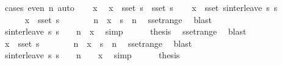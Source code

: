 \begin{isabellebody}
\ {\isacharparenleft}cases\ {\isachardoublequoteopen}even\ n{\isachardoublequoteclose}{\isacharparenright}\ auto\isanewline
{}\isamarkupfalse%
\isanewline
\ \ \isamarkupfalse%
\ x\ \isamarkupfalse%
\ {\isachardoublequoteopen}x\ {\isasymin}\ sset\ s{}\ {\isasymunion}\ sset\ s{}{\isachardoublequoteclose}\isanewline
\ \ \isamarkupfalse%
\ {\isachardoublequoteopen}x\ {\isasymin}\ sset\ {\isacharparenleft}sinterleave\ s{}\ s{}{\isacharparenright}{\isachardoublequoteclose}\isanewline
\ \ \isamarkupfalse%
\isanewline
\ \ \ \ \isamarkupfalse%
\ {\isachardoublequoteopen}x\ {\isasymin}\ sset\ s{}{\isachardoublequoteclose}\isanewline
\ \ \ \ \isamarkupfalse%
\ \isamarkupfalse%
\ n\ \ {\isachardoublequoteopen}x\ {\isacharequal}\ s{}\ {\isacharbang}{\isacharbang}\ n{\isachardoublequoteclose}\ \isamarkupfalse%
\ sset{\isacharunderscore}range\ \isamarkupfalse%
\ blast\isanewline
\ \ \ \ \isamarkupfalse%
\ {\isachardoublequoteopen}sinterleave\ s{}\ s{}\ {\isacharbang}{\isacharbang}\ {\isacharparenleft}{}\ {\isacharasterisk}\ n{\isacharparenright}\ {\isacharequal}\ x{\isachardoublequoteclose}\ \isamarkupfalse%
\ simp\isanewline
\ \ \ \ \isamarkupfalse%
\ {\isacharquery}thesis\ \isamarkupfalse%
\ sset{\isacharunderscore}range\ \isamarkupfalse%
\ blast\isanewline
\ \ \isamarkupfalse%
\isanewline
\ \ \ \ \isamarkupfalse%
\ {\isachardoublequoteopen}x\ {\isasymin}\ sset\ s{}{\isachardoublequoteclose}\isanewline
\ \ \ \ \isamarkupfalse%
\ \isamarkupfalse%
\ n\ \ {\isachardoublequoteopen}x\ {\isacharequal}\ s{}\ {\isacharbang}{\isacharbang}\ n{\isachardoublequoteclose}\ \isamarkupfalse%
\ sset{\isacharunderscore}range\ \isamarkupfalse%
\ blast\isanewline
\ \ \ \ \isamarkupfalse%
\ {\isachardoublequoteopen}sinterleave\ s{}\ s{}\ {\isacharbang}{\isacharbang}\ {\isacharparenleft}{}\ {\isacharasterisk}\ n\ {\isacharplus}\ {}{\isacharparenright}\ {\isacharequal}\ x{\isachardoublequoteclose}\ \isamarkupfalse%
\ simp\isanewline
\ \ \ \ \isamarkupfalse%
\ {\isacharquery}thesis\ \isamarkupfalse%

\end{isabellebody}
